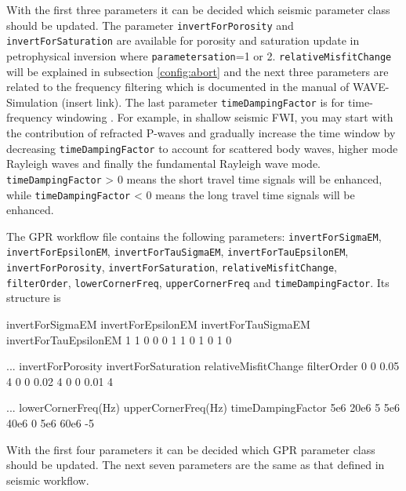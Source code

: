 \documentclass[pdftex,a4paper,parskip,listof=totoc,bibliography=totoc,onehalfspacing,12pt]{scrreprt}
\begin{document}
With the first three parameters it can be decided which seismic parameter class should be updated. The parameter \verb+invertForPorosity+ and \verb+invertForSaturation+ are available for porosity and saturation update in petrophysical inversion where \verb+parametersation+=1 or 2. \verb+relativeMisfitChange+ will be explained in subsection \ref{config:abort} and the next three parameters are related to the frequency filtering which is documented in the manual of WAVE-Simulation (insert link). The last parameter \verb+timeDampingFactor+ is for time-frequency windowing \citep{athanasopoulos2020time}. For example, in shallow seismic FWI, you may start with the contribution of refracted P-waves and gradually increase the time window by decreasing \verb+timeDampingFactor+ to account for scattered body waves, higher mode Rayleigh waves and finally the fundamental Rayleigh wave mode. \verb+timeDampingFactor+ > 0 means the short travel time signals will be enhanced, while \verb+timeDampingFactor+ < 0 means the long travel time signals will be enhanced.

The GPR workflow file contains the following parameters: \verb+invertForSigmaEM+, \verb+invertForEpsilonEM+, \verb+invertForTauSigmaEM+, \verb+invertForTauEpsilonEM+, \verb+invertForPorosity+, \verb+invertForSaturation+, \verb+relativeMisfitChange+, \verb+filterOrder+, \verb+lowerCornerFreq+, \verb+upperCornerFreq+ and \verb+timeDampingFactor+. Its structure is 
\begin{verbnobox}[\fontsize{11pt}{11pt}\selectfont]
invertForSigmaEM invertForEpsilonEM invertForTauSigmaEM invertForTauEpsilonEM
      1                1                  0                   0                 
      0                1                  1                   0                 
      1                0                  1                   0                 
\end{verbnobox}
\begin{verbnobox}[\fontsize{11pt}{11pt}\selectfont]
... invertForPorosity invertForSaturation relativeMisfitChange filterOrder 
          0                 0                      0.05            4
          0                 0                      0.02            4
          0                 0                      0.01            4
\end{verbnobox}
\begin{verbnobox}[\fontsize{11pt}{11pt}\selectfont]
... lowerCornerFreq(Hz) upperCornerFreq(Hz) timeDampingFactor
         5e6                 20e6                5  
         5e6                 40e6                0
         5e6                 60e6               -5
\end{verbnobox}
With the first four parameters it can be decided which GPR parameter class should be updated. The next seven parameters are the same as that defined in seismic workflow.
\end{document}
